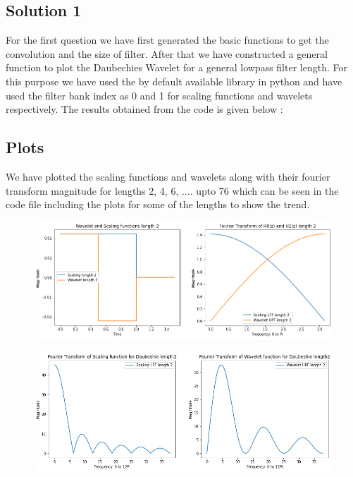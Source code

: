 \documentclass{article}
\begin{document}
\subsection{Solution 1}
For the first question we have first generated the basic functions to get the convolution and the size of filter. After that we have constructed a general function to plot the Daubechies Wavelet for a general lowpass filter length. For this purpose we have used the by default available library in python and have used the filter bank index as 0 and 1 for scaling functions and wavelets respectively. The results obtained from the code is given below :

\subsection{Plots}

We have plotted the scaling functions and wavelets along with their fourier transform magnitude for lengths 2, 4, 6, .... upto 76 which can be seen in the code file including the plots for some of the lengths to show the trend.

\begin{figure}[H]
\begin{center}
\includegraphics[scale = 0.5]{2.png}
\end{center}
\end{figure}

\begin{figure}[H]
\begin{center}
\includegraphics[scale = 0.5]{2f.png}
\end{center}
\end{figure}
\end{document}
